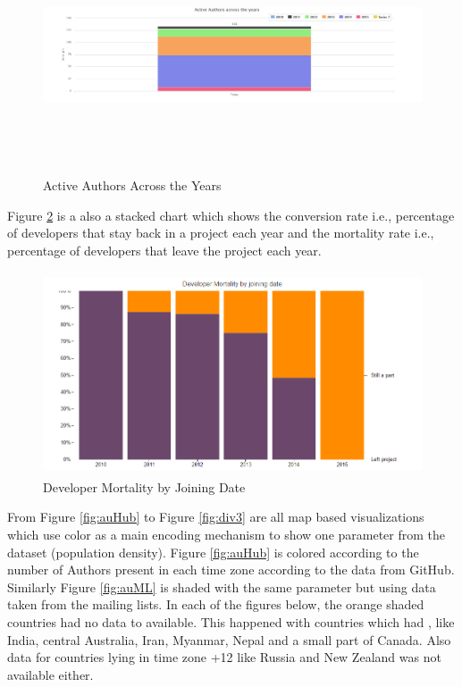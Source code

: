 \documentclass[double,12pt]{beavtex}
\begin{document}
\begin{figure}[H]
\centering
\includegraphics[width=170mm,height=70mm]{image2.PNG}
\caption{Active Authors Across the Years}
\label{fig:actAuth}
\end{figure}

Figure \ref{fig:devMort} is a also a stacked chart which shows the conversion rate i.e., percentage of developers that stay back in a project each year and the mortality rate i.e., percentage of developers that leave the project each year.

\begin{figure}[H]
\centering
\includegraphics[width=130mm,height=60mm]{image3.PNG}
\caption{Developer Mortality by Joining Date}
\label{fig:devMort}
\end{figure}

From Figure \ref{fig:auHub} to Figure \ref{fig:div3} are all map based visualizations which use color as a main encoding mechanism to show one parameter from the dataset (population density). Figure \ref{fig:auHub} is colored according to the number of Authors present in each time zone according to the data from GitHub. Similarly Figure \ref{fig:auML} is shaded with the same parameter but using data taken from the mailing lists. In each of the figures below, the orange shaded countries had no data to available. This happened with countries which had , like India, central Australia, Iran, Myanmar, Nepal and a small part of Canada. Also data for countries lying in time zone +12 like Russia and New Zealand was not available either.
\end{document}
